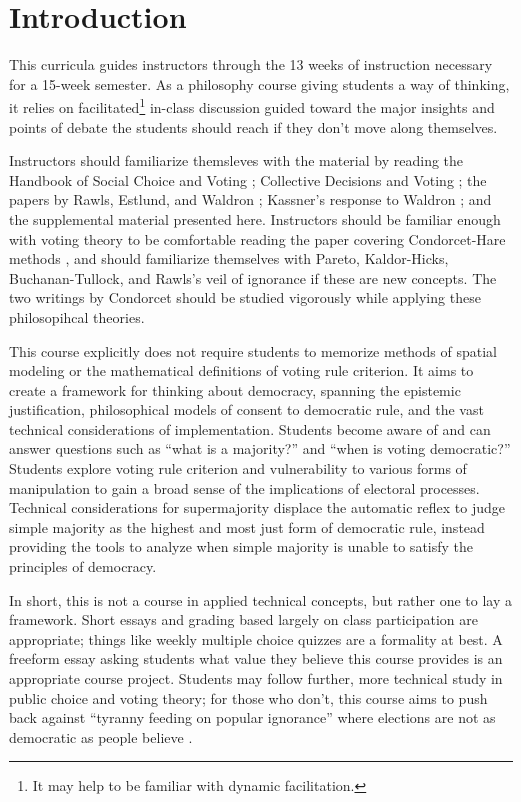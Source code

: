 \chapter{Introduction}
This curricula guides instructors through the 13 weeks of instruction necessary for a 15-week semester.  As a philosophy course giving students a way of thinking, it relies on facilitated\footnote{It may help to be familiar with dynamic facilitation.} in-class discussion guided toward the major insights and points of debate the students should reach if they don't move along themselves.

Instructors should familiarize themsleves with the material by reading the Handbook of Social Choice and Voting \autocite{Heckelman2015}; Collective Decisions and Voting \autocite{Tideman2006}; the papers by Rawls, Estlund, and Waldron \autocite{Rawls1997,Estlund2008,Waldron1998}; Kassner's response to Waldron \autocite{Kassner2006}; and the supplemental material presented here.  Instructors should be familiar enough with voting theory to be comfortable reading the paper covering Condorcet-Hare methods \autocite{GreenArmytage2011}, and should familiarize themselves with Pareto, Kaldor-Hicks, Buchanan-Tullock, and Rawls's veil of ignorance if these are new concepts.  The two writings by Condorcet should be studied vigorously \autocite{Condorcet1781,Condorcet1789} while applying these philosopihcal theories.

This course explicitly does not require students to memorize methods of spatial modeling or the mathematical definitions of voting rule criterion.  It aims to create a framework for thinking about democracy, spanning the epistemic justification, philosophical models of consent to democratic rule, and the vast technical considerations of implementation.  Students become aware of and can answer questions such as ``what is a majority?'' and ``when is voting democratic?''  Students explore voting rule criterion and vulnerability to various forms of manipulation to gain a broad sense of the implications of electoral processes.  Technical considerations for supermajority displace the automatic reflex to judge simple majority as the highest and most just form of democratic rule, instead providing the tools to analyze when simple majority is unable to satisfy the principles of democracy.

In short, this is not a course in applied technical concepts, but rather one to lay a framework.  Short essays and grading based largely on class participation are appropriate; things like weekly multiple choice quizzes are a formality at best.  A freeform essay asking students what value they believe this course provides is an appropriate course project.  Students may follow further, more technical study in public choice and voting theory; for those who don't, this course aims to push back against ``tyranny feeding on popular ignorance'' where elections are not as democratic as people believe \autocite{Yastrebtseva2015}.